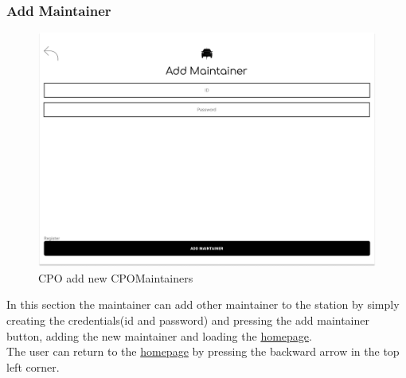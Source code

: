 \subsubsection{Add Maintainer}
\begin{figure}[H]
    \centering
    \includegraphics[keepaspectratio, width=15cm]{Mockup/CPMSSiteInterface/Add Maintainer.png}
    \caption{\ac{CPO} add new \ac{CPO}Maintainers}
    \label{cpo:Maintainer}
\end{figure}
In this section the maintainer can add other maintainer to the station by simply creating the credentials(id and password) and pressing the add maintainer button, adding the new maintainer and loading the \hyperref[cpo:Homepage]{homepage}.\\
The user can return to the \hyperref[cpo:Homepage]{homepage} by pressing the backward arrow in the top left corner.
